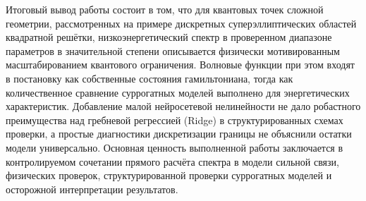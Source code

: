 Итоговый вывод работы состоит в том, что для квантовых точек сложной геометрии,
рассмотренных на примере дискретных суперэллиптических областей квадратной решётки,
низкоэнергетический спектр в проверенном диапазоне параметров в значительной степени
описывается физически мотивированным масштабированием квантового ограничения. Волновые
функции при этом входят в постановку как собственные состояния гамильтониана, тогда как
количественное сравнение суррогатных моделей выполнено для энергетических характеристик.
Добавление малой нейросетевой нелинейности не дало робастного преимущества над гребневой
регрессией (Ridge) в структурированных схемах проверки, а простые диагностики
дискретизации границы не объяснили остатки модели универсально. Основная ценность
выполненной работы заключается в контролируемом сочетании прямого расчёта спектра в модели
сильной связи, физических проверок, структурированной проверки суррогатных моделей и
осторожной интерпретации результатов.

\clearpage
